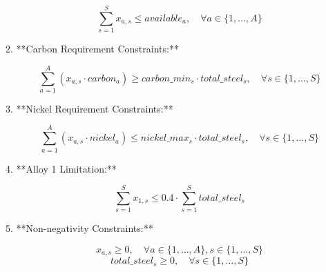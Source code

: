 \documentclass{article}
\begin{document}
\[
\sum_{s=1}^{S} x_{a,s} \leq available_{a}, \quad \forall a \in \{1, \ldots, A\}
\]

2. **Carbon Requirement Constraints:**

\[
\sum_{a=1}^{A} \left( x_{a,s} \cdot carbon_{a} \right) \geq carbon\_min_{s} \cdot total\_steel_{s}, \quad \forall s \in \{1, \ldots, S\}
\]

3. **Nickel Requirement Constraints:**

\[
\sum_{a=1}^{A} \left( x_{a,s} \cdot nickel_{a} \right) \leq nickel\_max_{s} \cdot total\_steel_{s}, \quad \forall s \in \{1, \ldots, S\}
\]

4. **Alloy 1 Limitation:**

\[
\sum_{s=1}^{S} x_{1,s} \leq 0.4 \cdot \sum_{s=1}^{S} total\_steel_{s}
\]

5. **Non-negativity Constraints:**

\[
x_{a,s} \geq 0, \quad \forall a \in \{1, \ldots, A\}, s \in \{1, \ldots, S\}
\]
\[
total\_steel_{s} \geq 0, \quad \forall s \in \{1, \ldots, S\}
\]
\end{document}
